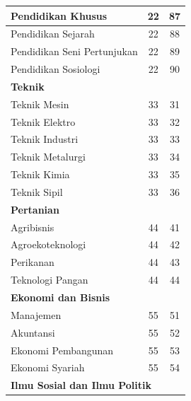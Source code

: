\documentclass[
]{book}
\begin{document}
\begin{longtable}{l|c|c}
\hline
\hspace{1em}Pendidikan Khusus & 22 & 87\\
\hline
\hspace{1em}Pendidikan Sejarah & 22 & 88\\
\hline
\hspace{1em}Pendidikan Seni Pertunjukan & 22 & 89\\
\hline
\hspace{1em}Pendidikan Sosiologi & 22 & 90\\
\hline
\multicolumn{3}{l}{\textbf{Teknik}}\\
\hline
\hspace{1em}Teknik Mesin & 33 & 31\\
\hline
\hspace{1em}Teknik Elektro & 33 & 32\\
\hline
\hspace{1em}Teknik Industri & 33 & 33\\
\hline
\hspace{1em}Teknik Metalurgi & 33 & 34\\
\hline
\hspace{1em}Teknik Kimia & 33 & 35\\
\hline
\hspace{1em}Teknik Sipil & 33 & 36\\
\hline
\multicolumn{3}{l}{\textbf{Pertanian}}\\
\hline
\hspace{1em}Agribisnis & 44 & 41\\
\hline
\hspace{1em}Agroekoteknologi & 44 & 42\\
\hline
\hspace{1em}Perikanan & 44 & 43\\
\hline
\hspace{1em}Teknologi Pangan & 44 & 44\\
\hline
\multicolumn{3}{l}{\textbf{Ekonomi dan Bisnis}}\\
\hline
\hspace{1em}Manajemen & 55 & 51\\
\hline
\hspace{1em}Akuntansi & 55 & 52\\
\hline
\hspace{1em}Ekonomi Pembangunan & 55 & 53\\
\hline
\hspace{1em}Ekonomi Syariah & 55 & 54\\
\hline
\multicolumn{3}{l}{\textbf{Ilmu Sosial dan Ilmu Politik}}\\

\end{longtable}
\end{document}
